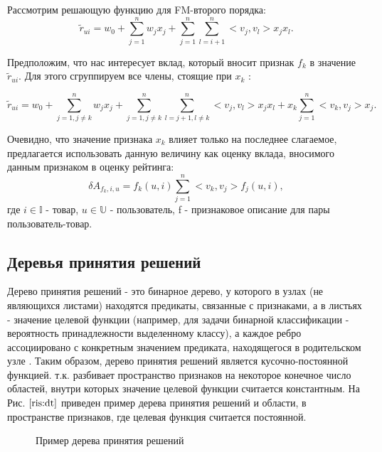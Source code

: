 \documentclass[12pt,a4paper]{report}
\begin{document}
Рассмотрим решающую функцию для FM-второго порядка:
\begin{equation*}
\tilde{r}_{ui} = w_0 + \sum_{j=1}^{n}w_jx_j + \sum_{j=1}^{n}\sum_{l=i+1}^{n}<v_j, v_l>x_jx_l.
\end{equation*}

Предположим, что нас интересует вклад, который вносит признак $f_k$ в значение $\tilde{r}_{ui}$. Для этого сгруппируем все члены, стоящие при $x_k$ :

\begin{equation*}
\tilde{r}_{ui} = w_0 + \sum_{j=1, j \neq k}^{n}w_jx_j + \sum_{j=1, j \neq k}^{n}\sum_{l=j+1, l \neq k}^{n}<v_j, v_l>x_jx_l + x_k \sum_{j = 1}^{n}<v_k, v_j>x_j.
\end{equation*}

Очевидно, что значение признака $x_k$ влияет только на последнее слагаемое, предлагается использовать данную величину как оценку вклада, вносимого данным признаком в оценку рейтинга:
\begin{equation*}
\delta A_{f_k, i, u} = f_k(u, i) \sum_{j = 1}^{n}<v_k, v_j>f_j(u, i),
\end{equation*}
где $i \in \mathbb{I}$ - товар, $u \in \mathbb{U}$ - пользователь, f - признаковое описание для пары пользователь-товар.


\subsection{Деревья принятия решений}
Дерево принятия решений - это бинарное дерево, у которого в узлах (не являющихся листами) находятся предикаты, связанные с признаками, а в листьях - значение целевой функции (например, для задачи бинарной классификации - вероятность принадлежности выделенному классу), а каждое ребро ассоциировано с конкретным значением предиката, находящегося в родительском узле \cite{Dt}.
Таким образом, дерево принятия решений является кусочно-постоянной функцией. т.к. разбивает пространство признаков на некоторое конечное число областей, внутри которых значение целевой функции считается константным. На Рис. $\ref{ris:dt}$ приведен пример дерева принятия решений и области, в пространстве признаков, где целевая функция считается постоянной.

\begin{figure}[H]
\center{\texttt{[image: dt]}}
\caption{Пример дерева принятия решений}
\label{ris:dt}
\end{figure}
\end{document}
